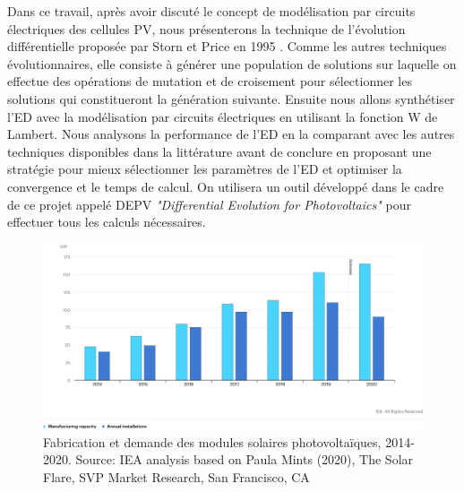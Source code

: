 Dans ce travail, après avoir discuté le concept de modélisation par circuits électriques des cellules PV, nous présenterons la technique de l'évolution différentielle proposée par Storn et Price en 1995 \cite{Storn1995}. Comme les autres techniques évolutionnaires, elle consiste à générer une population de solutions sur laquelle on effectue des opérations de mutation et de croisement pour sélectionner les solutions qui constitueront la génération suivante. Ensuite nous allons synthétiser l'ED avec la modélisation par circuits électriques en utilisant la fonction W de Lambert. Nous analysons la performance de l'ED en la comparant avec les autres techniques disponibles dans la littérature avant de conclure en proposant une stratégie pour mieux sélectionner les paramètres de l'ED et optimiser la convergence et le temps de calcul. On utilisera un outil développé dans le cadre de ce projet appelé DEPV \textit{"Differential Evolution for Photovoltaics"} pour effectuer tous les calculs nécessaires.
\begin{figure}
  \begin{center}
    \includegraphics[width=\textwidth]{resources/ieapv.png}
    \caption{Fabrication et demande des modules solaires photovoltaïques, 2014-2020. Source: IEA analysis based on Paula Mints (2020), The Solar Flare, SVP Market Research, San Francisco, CA \cite{iea2020}}
    \label{fig:ieapv}
  \end{center}
\end{figure}  
